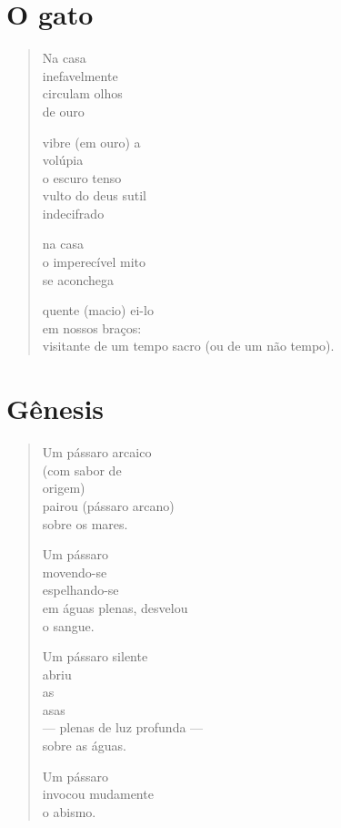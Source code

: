 \chapter{O gato}

\begin{verse}
Na casa\\
inefavelmente\\
circulam olhos\\
de ouro

vibre (em ouro) a\\
\quad\quad volúpia\\
o escuro tenso\\
vulto do deus sutil\\
indecifrado

na casa\\
o imperecível mito\\
se aconchega

quente (macio) ei-lo\\
em nossos braços:\\
visitante de um tempo sacro (ou de um não tempo).
\end{verse}

\chapter{Gênesis}

\begin{verse}
Um pássaro arcaico\\
(com sabor de\\
\quad \quad origem)\\
pairou (pássaro arcano)\\
\quad sobre os mares.

Um pássaro\\
movendo-se\\
espelhando-se\\
em águas plenas, desvelou\\
o sangue.

Um pássaro silente\\
abriu\\
as\\
asas\\
--- plenas de luz profunda ---\\
sobre as águas.

Um pássaro\\
invocou mudamente\\
o abismo.
\end{verse}

